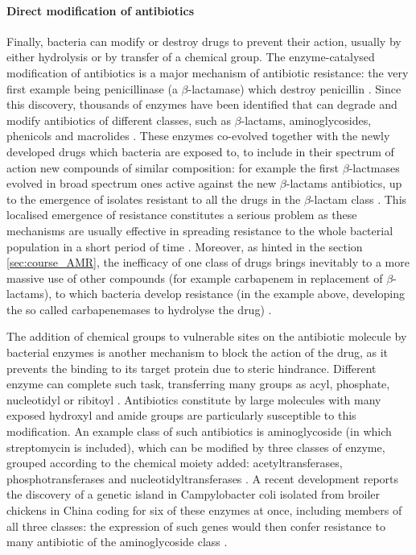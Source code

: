 \paragraph{Direct modification of antibiotics}
Finally, bacteria can modify or destroy drugs to prevent their action, usually by either hydrolysis or by transfer of a chemical group.
%
The enzyme-catalysed modification of antibiotics is a major mechanism of antibiotic resistance: the very first example being penicillinase (a $\beta$-lactamase) which destroy penicillin \cite{Abraham1988}.
%
Since this discovery, thousands of enzymes have been identified that can degrade and modify antibiotics of different classes, such as $\beta$-lactams, aminoglycosides, phenicols and macrolides \cite{Livermore2008,Nordmann2011,Voulgari2013,Woodford2011}.
%
These enzymes co-evolved together with the newly developed  drugs which bacteria are exposed to, to include in their spectrum of action new compounds of similar composition: for example the first $\beta$-lactmases evolved in broad spectrum ones active against the new $\beta$-lactams antibiotics, up to the emergence of isolates resistant to all the drugs in the $\beta$-lactam class \cite{Woodford2013}.
%
This localised emergence of resistance constitutes a serious problem as these mechanisms are usually effective in spreading resistance to the whole bacterial population in a short period of time \cite{Voulgari2013,Woodford2013,Lynch2013}.
%
Moreover, as hinted in the section \ref{sec:course_AMR}, the inefficacy of one class of drugs brings inevitably to a more massive use of other compounds (for example carbapenem in replacement of $\beta$-lactams), to which bacteria develop resistance (in the example above, developing the so called carbapenemases to hydrolyse the drug) \cite{Queenan2007,Queenan2010,Tzouvelekis2012}.

The addition of chemical groups to vulnerable sites on the antibiotic molecule by bacterial enzymes is another mechanism to block the action of the drug, as it prevents the binding to its target protein due to steric hindrance.
%
Different enzyme can complete such task, transferring many groups as acyl, phosphate, nucleotidyl or ribitoyl \cite{Wright2005}.
%
Antibiotics constitute by large molecules with many exposed hydroxyl and amide groups are particularly susceptible to this modification. An example class of such antibiotics is aminoglycoside (in which streptomycin is included), which can be modified by three classes of enzyme, grouped according to the chemical moiety added: acetyltransferases, phosphotransferases and nucleotidyltransferases \cite{Norris2013}.
%
A recent development reports the discovery of a genetic island in Campylobacter coli isolated from broiler chickens in China coding for six of these enzymes at once, including members of all three classes: the expression of such genes would then confer resistance to many antibiotic of the aminoglycoside class \cite{Qin2012}.

